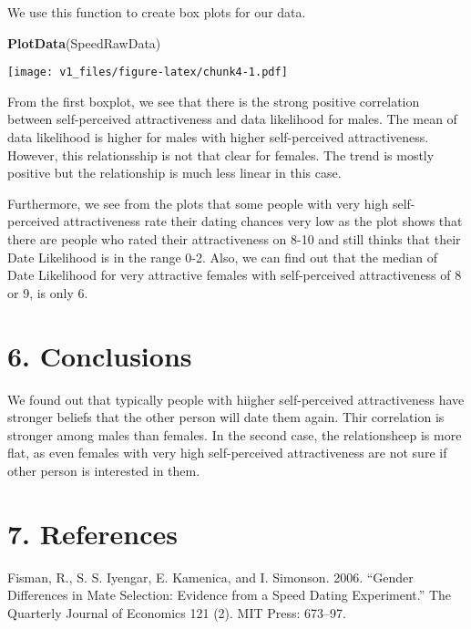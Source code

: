 \documentclass[]{article}
\newenvironment{Shaded}{\begin{snugshade}}{\end{snugshade}}
\newcommand{\KeywordTok}[1]{\textcolor[rgb]{0.13,0.29,0.53}{\textbf{#1}}}
\newcommand{\NormalTok}[1]{#1}
\begin{document}
We use this function to create box plots for our data.

\begin{Shaded}
\begin{Highlighting}[]
\KeywordTok{PlotData}\NormalTok{(SpeedRawData)}
\end{Highlighting}
\end{Shaded}

\texttt{[image: v1\_files/figure-latex/chunk4-1.pdf]}

From the first boxplot, we see that there is the strong positive
correlation between self-perceived attractiveness and data likelihood
for males. The mean of data likelihood is higher for males with higher
self-perceived attractiveness.\\
However, this relationsship is not that clear for females. The trend is
mostly positive but the relationship is much less linear in this case.

Furthermore, we see from the plots that some people with very high
self-perceived attractiveness rate their dating chances very low as the
plot shows that there are people who rated their attractiveness on 8-10
and still thinks that their Date Likelihood is in the range 0-2. Also,
we can find out that the median of Date Likelihood for very attractive
females with self-perceived attractiveness of 8 or 9, is only 6.

\hypertarget{conclusions}{%
\section{6. Conclusions}\label{conclusions}}

We found out that typically people with hiigher self-perceived
attractiveness have stronger beliefs that the other person will date
them again. Thir correlation is stronger among males than females. In
the second case, the relationsheep is more flat, as even females with
very high self-perceived attractiveness are not sure if other person is
interested in them.

\hypertarget{references}{%
\section{7. References}\label{references}}

Fisman, R., S. S. Iyengar, E. Kamenica, and I. Simonson. 2006. ``Gender
Differences in Mate Selection: Evidence from a Speed Dating
Experiment.'' The Quarterly Journal of Economics 121 (2). MIT Press:
673--97.
\end{document}
